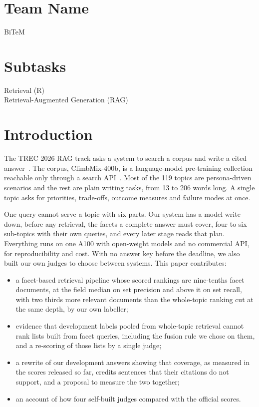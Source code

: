 \documentclass[sigconf,nonacm]{acmart}
\begin{document}
\maketitle

\section*{Team Name}
BiTeM

\section*{Subtasks}
Retrieval (R) \\
Retrieval-Augmented Generation (RAG)

\section{Introduction}

The TREC 2026 RAG track asks a system to search a corpus and write a cited
answer~\cite{trecrag2026}. The corpus, ClimbMix-400b, is a language-model
pre-training collection reachable only through a search API~\cite{lin2021pyserini}.
Most of the 119 topics are persona-driven scenarios and the rest are plain writing
tasks, from 13 to 206 words long. A single topic asks for priorities, trade-offs,
outcome measures and failure modes at once.

One query cannot serve a topic with six parts. Our system has a model write down,
before any retrieval, the facets a complete answer must cover, four to six
sub-topics with their own queries, and every later stage reads that plan.
Everything runs on one A100 with open-weight models and no commercial API, for
reproducibility and cost. With no answer key before the deadline, we also built our
own judges to choose between systems. This paper contributes:
\begin{itemize}\setlength{\itemsep}{1pt}
\item a facet-based retrieval pipeline whose scored rankings are nine-tenths facet
documents, at the field median on set precision and above it on set recall, with
two thirds more relevant documents than the whole-topic ranking cut at the same
depth, by our own labeller;
\item evidence that development labels pooled from whole-topic retrieval cannot
rank lists built from facet queries, including the fusion rule we chose on them,
and a re-scoring of those lists by a single judge;
\item a rewrite of our development answers showing that coverage, as measured in
the scores released so far, credits sentences that their citations do not support,
and a proposal to measure the two together;
\item an account of how four self-built judges compared with the official scores.
\end{itemize}
\end{document}
